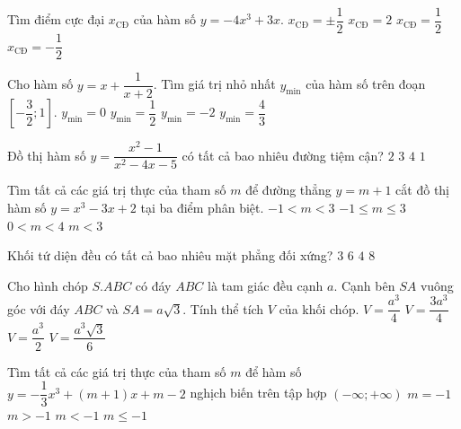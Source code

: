 \begin{ex}%
	Tìm điểm cực đại $x_{\text{CĐ}}$ của hàm số $y=-4x^3+3x$.
	\choice
	{$x_{\text{CĐ}}=\pm\dfrac{1}{2}$}
	{$x_{\text{CĐ}}=2$}
	{\True $x_{\text{CĐ}}=\dfrac{1}{2}$}
	{$x_{\text{CĐ}}=-\dfrac{1}{2}$}
\end{ex}
\begin{ex}%
	Cho hàm số $y=x+\dfrac{1}{x+2}$. Tìm giá trị nhỏ nhất $y_{\min}$ của hàm số trên đoạn $\left[-\dfrac{3}{2};1\right]$.
	\choice
	{\True $y_{\min}=0$}
	{$y_{\min}=\dfrac{1}{2}$}
	{$y_{\min}=-2$}
	{$y_{\min}=\dfrac{4}{3}$}
\end{ex}
\begin{ex}%
	Đồ thị hàm số $y=\dfrac{x^2-1}{x^2-4x-5}$ có tất cả bao nhiêu đường tiệm cận?
	\choice
	{\True $2$}
	{$3$}
	{$4$}
	{$1$}
\end{ex}
\begin{ex}%
	Tìm tất cả các giá trị thực của tham số $m$ để đường thẳng $y=m+1$ cắt đồ thị hàm số $y=x^3-3x+2$ tại ba điểm phân biệt.
	\choice
	{\True $-1<m<3$}
	{$-1\leq m\leq 3$}
	{$0<m<4$}
	{$m<3$}
\end{ex}
\begin{ex}%
	Khối tứ diện đều có tất cả bao nhiêu mặt phẳng đối xứng? 
	\choice
	{$3$}
	{\True $6$}
	{$4$}
	{$8$}
\end{ex}
\begin{ex}%
	Cho hình chóp $S.ABC$ có đáy $ABC$ là tam giác đều cạnh $a$. Cạnh bên $SA$ vuông góc với đáy $ABC$ và $SA=a\sqrt{3}$. Tính thể tích $V$ của khối chóp.
	\choice
	{\True $V=\dfrac{a^3}{4}$}
	{$V=\dfrac{3a^3}{4}$}
	{$V=\dfrac{a^3}{2}$}
	{$V=\dfrac{a^3\sqrt{3}}{6}$}
\end{ex}
\begin{ex}%
	Tìm tất cả các giá trị thực của tham số $m$ để hàm số $y=-\dfrac{1}{3}x^3+(m+1)x+m-2$ nghịch biến trên tập hợp $(-\infty;+\infty)$
	\choice
	{$m=-1$}
	{$m>-1$}
	{$m<-1$}
	{\True $m\leq -1$}
\end{ex}
